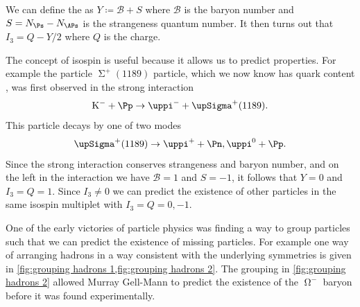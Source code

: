\documentclass[fleqn]{NotesClass}
\makeatletter
\newcommand{\PBASE@pion}{\uppi}
\newcommand{\Ppiplus}{\ensuremath{\PBASE@pion^+}}
\newcommand{\Ppiminus}{\ensuremath{\PBASE@pion^-}}
\newcommand{\Ppineutral}{\ensuremath{\PBASE@pion^0}}
\newcommand{\Ppizero}{\Ppineutral}
\newcommand{\PBASE@kaon}{\mathrm{K}}
\newcommand{\PKminus}{\ensuremath{\PBASE@kaon^-}}
\newcommand*{\baryonnumber}{\mathcal{B}}
\makeatother
\begin{document}
    We can define the  as \(Y \coloneqq \baryonnumber + S\) where \(\baryonnumber\) is the baryon number and \(S = N_{\Ps} - N_{\APs}\) is the strangeness quantum number.
    It then turns out that \(I_3 = Q - Y/2\) where \(Q\) is the charge.
    
    The concept of isospin is useful because it allows us to predict properties.
    For example the particle \(\upSigma^+(1189)\) particle, which we now know has quark content \Pu\Pu\Ps, was first observed in the strong interaction
    \begin{equation}
        \PKminus + \Pp \to \Ppiminus + \upSigma^+(1189).
    \end{equation}
    This particle decays by one of two modes
    \begin{equation}
        \upSigma^+(1189) \to \Ppiplus + \Pn, \Ppizero + \Pp.
    \end{equation}
    Since the strong interaction conserves strangeness and baryon number, and on the left in the interaction we have \(\baryonnumber = 1\) and \(S = -1\), it follows that \(Y = 0\) and \(I_3 = Q = 1\).
    Since \(I_3 \ne 0\) we can predict the existence of other particles in the same isospin multiplet with \(I_3 = Q = 0, -1\).
    
    One of the early victories of particle physics was finding a way to group particles such that we can predict the existence of missing particles.
    For example one way of arranging hadrons in a way consistent with the underlying symmetries is given in \cref{fig:grouping hadrons 1,fig:grouping hadrons 2}.
    The grouping in \cref{fig:grouping hadrons 2} allowed Murray Gell-Mann to predict the existence of the \(\upOmega^-\) baryon before it was found experimentally.
    
\end{document}
